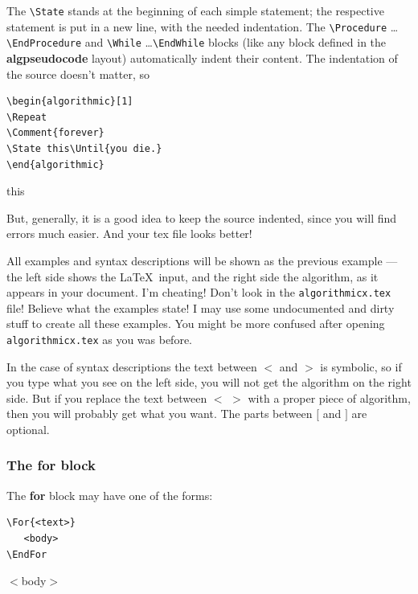 \documentclass{article}
\newcommand\ASTART{\bigskip\noindent\begin{minipage}[b]{0.5\linewidth}}
\newcommand\ACONTINUE{\end{minipage}\begin{minipage}[b]{0.5\linewidth}}
\newcommand\AENDSKIP{\end{minipage}\bigskip}
\newcommand\AEND{\end{minipage}}
\begin{document}
The \verb:\State: stands at the beginning of each simple statement; the respective 
statement is put in a new line, with the needed indentation.
The \verb:\Procedure: \dots\verb:\EndProcedure: and 
\verb:\While: \dots\verb:\EndWhile: blocks (like any block defined in the 
\textbf{algpseudocode} layout) automatically indent their content.
The indentation of the source doesn't matter, so

\ASTART
\begin{verbatim}
\begin{algorithmic}[1]
\Repeat
\Comment{forever}
\State this\Until{you die.}
\end{algorithmic}
\end{verbatim}
\ACONTINUE
\begin{algorithmic}[1]
\Repeat
{}
\State this
\Statex
\end{algorithmic}
\AENDSKIP

But, generally, it is a good idea to keep the source indented, since you will find 
errors much easier. And your tex file looks better!

All examples and syntax descriptions will be shown as the previous 
example --- the left side shows the \LaTeX\ input, and the right side 
the algorithm, as it appears in your document. I'm cheating! Don't look 
in the \verb:algorithmicx.tex: file! Believe what the examples state! I may use some 
undocumented and dirty stuff to create all these examples. You might be more 
confused after opening \verb:algorithmicx.tex: as you was before.

In the case of syntax 
descriptions the text between $<$ and $>$ is symbolic, so if you type 
what you see on the left side, you will not get the algorithm on the 
right side. But if you replace the text between $<$ $>$ with a proper piece of 
algorithm, then you will probably get what you want. The parts between 
$[$ and $]$ are optional.

\subsubsection{The \textbf{for} block}
The \textbf{for} block may have one of the forms:

\ASTART
\begin{verbatim}
\For{<text>}
   <body>
\EndFor
\end{verbatim}
\ACONTINUE
\begin{algorithmic}[1]
   \State $<$body$>$
\EndFor
\end{algorithmic}
\AEND
\end{document}
